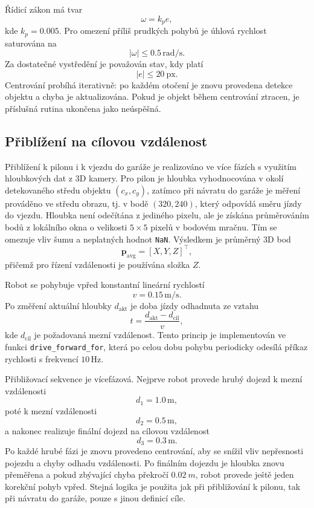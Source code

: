 \documentclass[a4paper,11pt]{article}
\begin{document}
Řídicí zákon má tvar
\begin{equation}
  \omega = k_p e,
\end{equation}
kde $k_p = 0.005$. Pro omezení příliš prudkých pohybů je úhlová rychlost saturována na
\[
|\omega| \leq 0.5\,\mathrm{rad/s}.
\]
Za dostatečné vystředění je považován stav, kdy platí
\[
|e| \leq 20 \ \mathrm{px}.
\]
Centrování probíhá iterativně: po každém otočení je znovu provedena detekce objektu a chyba je aktualizována. Pokud je objekt během centrování ztracen, je příslušná rutina ukončena jako neúspěšná.

\subsection{Přiblížení na cílovou vzdálenost}
Přiblížení k pilonu i k vjezdu do garáže je realizováno ve více fázích s využitím hloubkových dat z 3D kamery. Pro pilon je hloubka vyhodnocována v okolí detekovaného středu objektu $(c_x,c_y)$, zatímco při návratu do garáže je měření prováděno ve středu obrazu, tj. v bodě $(320,240)$, který odpovídá směru jízdy do vjezdu. Hloubka není odečítána z jediného pixelu, ale je získána průměrováním bodů z lokálního okna o velikosti $5 \times 5$ pixelů v bodovém mračnu. Tím se omezuje vliv šumu a neplatných hodnot \texttt{NaN}. Výsledkem je průměrný 3D bod
\[
\mathbf{p}_{\mathrm{avg}} = [X,Y,Z]^\top,
\]
přičemž pro řízení vzdálenosti je používána složka $Z$.

Robot se pohybuje vpřed konstantní lineární rychlostí
\[
v = 0.15\,\mathrm{m/s}.
\]
Po změření aktuální hloubky $d_{\mathrm{akt}}$ je doba jízdy odhadnuta ze vztahu
\begin{equation}
  t = \frac{d_{\mathrm{akt}} - d_{\mathrm{cil}}}{v},
\end{equation}
kde $d_{\mathrm{cil}}$ je požadovaná mezní vzdálenost. Tento princip je implementován ve funkci \texttt{drive\_forward\_for}, která po celou dobu pohybu periodicky odesílá příkaz rychlosti s frekvencí $10\,\mathrm{Hz}$.

Přibližovací sekvence je vícefázová. Nejprve robot provede hrubý dojezd k mezní vzdálenosti
\[
d_1 = 1.0\,\mathrm{m},
\]
poté k mezní vzdálenosti
\[
d_2 = 0.5\,\mathrm{m},
\]
a nakonec realizuje finální dojezd na cílovou vzdálenost
\[
d_3 = 0.3\,\mathrm{m}.
\]
Po každé hrubé fázi je znovu provedeno centrování, aby se snížil vliv nepřesnosti pojezdu a chyby odhadu vzdálenosti. Po finálním dojezdu je hloubka znovu přeměřena a pokud zbývající chyba překročí $0.02 ~m$, robot provede ještě jeden korekční pohyb vpřed. Stejná logika je použita jak při přibližování k pilonu, tak při návratu do garáže, pouze s jinou definicí cíle.
\end{document}
